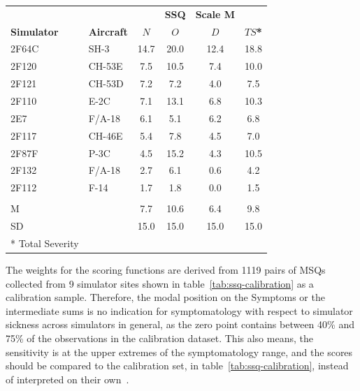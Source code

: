 \begin{center}
    \begin{tabular}{ l l c c c c}
        \toprule
         & & & \textbf{SSQ} & \textbf{Scale M} & \\
        \textbf{Simulator} & \textbf{Aircraft} & \textbf{$N$} & \textbf{$O$} & \textbf{$D$} & \textbf{$TS$*} \\
        \midrule
        2F64C & SH-3   & 14.7 & 20.0 & 12.4 & 18.8 \\
        2F120 & CH-53E & 7.5  & 10.5 & 7.4  & 10.0 \\
        2F121 & CH-53D & 7.2  & 7.2  & 4.0  & 7.5  \\
        2F110 & E-2C   & 7.1  & 13.1 & 6.8  & 10.3 \\
        2E7   & F/A-18 & 6.1  & 5.1  & 6.2  & 6.8  \\
        2F117 & CH-46E & 5.4  & 7.8  & 4.5  & 7.0  \\
        2F87F & P-3C   & 4.5  & 15.2 & 4.3  & 10.5 \\
        2F132 & F/A-18 & 2.7  & 6.1  & 0.6  & 4.2  \\
        2F112 & F-14   & 1.7  & 1.8  & 0.0  & 1.5  \\
              &        &      &      &      &      \\
        M     &        & 7.7  & 10.6 & 6.4  & 9.8  \\
        SD    &        & 15.0 & 15.0 & 15.0 & 15.0 \\
        \bottomrule
        * Total Severity & & & & & \\
    \end{tabular}
    \label{tab:ssq-calibration}
\end{center}

The weights for the scoring functions are derived from 1119 pairs of MSQs collected from 9 simulator sites
shown in table~\ref{tab:ssq-calibration} as a calibration sample.
Therefore, the modal position on the Symptoms or the intermediate sums is no indication for symptomatology with
respect to simulator sickness across simulators in general, as the zero point contains between 40\% and 75\% of the
observations in the calibration dataset.
This also means, the sensitivity is at the upper extremes of the symptomatology range, and the scores should be
compared to the calibration set, in table~\ref{tab:ssq-calibration}, instead of
interpreted on their own~\cite{Kennedy1993}.

